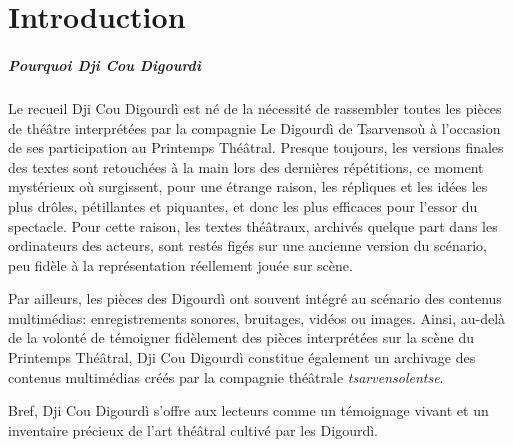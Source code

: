\chapter*{Introduction} 




\paragraph*{Pourquoi Dji Cou Digourdì}
Le recueil Dji Cou Digourdì est né de la nécessité de rassembler toutes les pièces de théâtre interprétées par la compagnie Le Digourdì de Tsarvensoù à l'occasion de ses participation au Printemps Thé\^atral. Presque toujours, les versions finales des textes sont retouchées à la main lors des dernières répétitions, ce moment mystérieux où surgissent, pour une étrange raison, les répliques et les idées les plus drôles, pétillantes et piquantes, et donc les plus efficaces pour l’essor du spectacle. Pour cette raison, les textes théâtraux, archivés quelque part dans les ordinateurs des acteurs, sont restés figés sur une ancienne version du scénario, peu fidèle à la représentation réellement jouée sur scène.

Par ailleurs, les pièces des Digourdì ont souvent intégré au scénario des contenus multimédias: enregistrements sonores, bruitages, vidéos ou images. Ainsi, au-delà de la volonté de témoigner fidèlement des pièces interprétées sur la scène du Printemps Thé\^atral, Dji Cou Digourdì constitue également un archivage des contenus multimédias créés par la compagnie théâtrale \textit{tsarvensolentse}.

Bref, Dji Cou Digourdì s'offre aux lecteurs comme un témoignage vivant et un inventaire précieux de l'art théâtral cultivé par les Digourdì.

